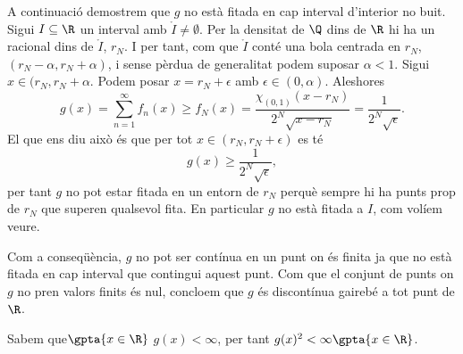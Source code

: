 \documentclass[12pt]{article}
\begin{document}
\parbreak

A continuació demostrem que \( g \) no està fitada en cap interval d'interior no buit.
Sigui \( I \subseteq \R \) un interval amb \( \mathring{I} \neq \emptyset \). Per la
densitat de \( \Q \) dins de \( \R \) hi ha un racional dins de \( \mathring{I} \), \(
r_N \). I per tant, com que \( \mathring{I} \) conté una bola centrada en \( r_N \), \(
(r_N - \alpha, r_N + \alpha) \), i sense pèrdua de generalitat podem suposar \( \alpha <
1 \). Sigui \( x \in (r_N, r_N + \alpha \). Podem posar \( x = r_N + \epsilon \) amb \(
\epsilon \in (0,\alpha) \). Aleshores 
\begin{equation*}
	g(x) = \sum_{n = 1}^{\infty} f_n(x) \geq f_N(x) = \frac{\chi_{(0,1)}(x - r_N)}{2^N
	\sqrt{x - r_N}} = \frac{1}{2^N \sqrt{\epsilon}}.
\end{equation*}
El que ens diu això és que per tot \( x \in (r_N, r_N + \epsilon) \) es té
\begin{equation*}
	g(x) \geq \frac{1}{2^N \sqrt{\epsilon}},
\end{equation*}
per tant \( g \) no pot estar fitada en un entorn de \( r_N \) perquè sempre hi ha punts
prop de \( r_N \) que superen qualsevol fita. En particular \( g \) no està fitada a \( I
\), com volíem veure.

Com a conseqüència, \( g \) no pot ser contínua en un punt on és finita ja que no està
fitada en cap interval que contingui aquest punt. Com que el conjunt de punts on \( g \)
no pren valors finits és nul, concloem que \( g \) és discontínua gairebé a tot punt de \(
\R \).

\parbreak

Sabem que\( \gpta{x \in \R} \) \( g(x) < \infty \), per tant \( g(x)^2 < \infty \gpta{x
\in \R} \). 
\end{document}
